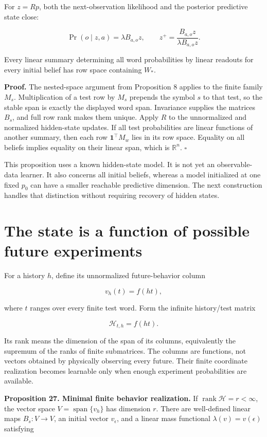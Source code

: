 For \(z=Rp\), both the next-observation likelihood and the posterior
predictive state close:

\[
\Pr(o\mid z,a)=\lambda B_{a,o}z,\qquad
z^+=\frac{B_{a,o}z}{\lambda B_{a,o}z}.
\]

Every linear summary determining all word probabilities by linear
readouts for every initial belief has row space containing \(W_*\).

\textbf{Proof.} The nested-space argument from Proposition 8 applies to
the finite family \(M_s\). Multiplication of a test row by \(M_s\)
prepends the symbol \(s\) to that test, so the stable span is exactly
the displayed word span. Invariance supplies the matrices \(B_s\), and
full row rank makes them unique. Apply \(R\) to the unnormalized and
normalized hidden-state updates. If all test probabilities are linear
functions of another summary, then each row \(\mathbf1^\top M_w\) lies
in its row space. Equality on all beliefs implies equality on their
linear span, which is \(\mathbb R^n\). \(\square\)

This proposition uses a known hidden-state model. It is not yet an
observable-data learner. It also concerns all initial beliefs, whereas a
model initialized at one fixed \(p_0\) can have a smaller reachable
predictive dimension. The next construction handles that distinction
without requiring recovery of hidden states.

\section{The state is a function of possible future experiments}\label{LSM:the-state-is-a-function-of-possible-future-experiments}

For a history \(h\), define its unnormalized future-behavior column

\[
v_h(t)=f(ht),
\]

where \(t\) ranges over every finite test word. Form the infinite
history/test matrix

\[
\mathscr H_{t,h}=f(ht).
\]

Its rank means the dimension of the span of its columns, equivalently
the supremum of the ranks of finite submatrices. The columns are
functions, not vectors obtained by physically observing every future.
Their finite coordinate realization becomes learnable only when enough
experiment probabilities are available.

\textbf{Proposition 27. Minimal finite behavior realization.} If
\(\operatorname{rank}\mathscr H=r<\infty\), the vector space
\(V=\operatorname{span}\{v_h\}\) has dimension \(r\). There are
well-defined linear maps \(B_s:V\to V\), an initial vector
\(v_\epsilon\), and a linear mass functional \(\lambda(v)=v(\epsilon)\)
satisfying

